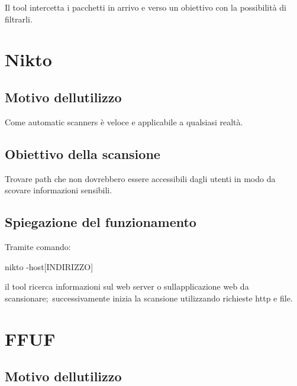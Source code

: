 \documentclass[
]{article}
\begin{document}
{Il tool intercetta i pacchetti in arrivo e verso un obiettivo con la
possibilità di filtrarli.}

{}

\section{\texorpdfstring{{Nikto}}{Nikto}}\label{h.3scydxz736u}

\subsection{\texorpdfstring{{Motivo
dell\textquotesingle utilizzo}}{Motivo dell\textquotesingle utilizzo}}\label{h.pk65094qd1ba}

{Come automatic scanners è veloce e applicabile a qualsiasi realtà.}

\subsection{\texorpdfstring{{Obiettivo della
scansione}}{Obiettivo della scansione}}\label{h.v8e13aujp8bs}

{Trovare path che non dovrebbero essere accessibili dagli utenti in modo
da scovare informazioni sensibili.}

\subsection{\texorpdfstring{{Spiegazione del
funzionamento}}{Spiegazione del funzionamento}}\label{h.me4nvlhmahdn}

{Tramite comando:}

{nikto -host{[}INDIRIZZO{]}}

{}

{il tool ricerca informazioni sul web server o
sull\textquotesingle applicazione web da
}{scansionare;}{~successivamente inizia la scansione utilizzando
richieste http e file.}

\section{\texorpdfstring{{FFUF}}{FFUF}}\label{h.sqt62nmz4moo}

\subsection{\texorpdfstring{{Motivo
dell\textquotesingle utilizzo}}{Motivo dell\textquotesingle utilizzo}}\label{h.9x6besqrxucw}
\end{document}
